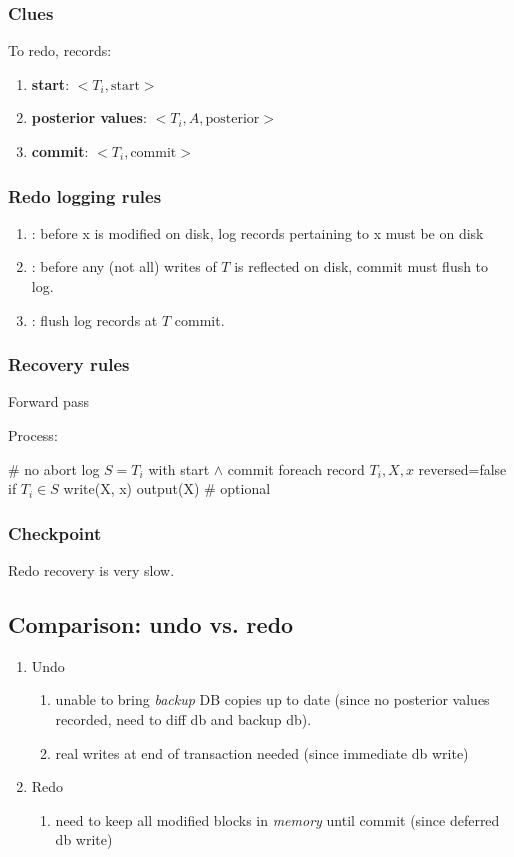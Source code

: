 \documentclass[a4paper]{report}
\begin{document}
\subsubsection{Clues}
To redo, records:
\begin{enumerate}
\item \textbf{start}: $<T_i, \text{start}>$
\item \textbf{posterior values}: $<T_i, A, \text{posterior}>$
\item \textbf{commit}: $<T_i, \text{commit}>$
\end{enumerate}

\subsubsection{Redo logging rules}
\begin{enumerate}
\item {}: before x is modified on disk, log records pertaining to x must be on disk
\item {}: before any (not all) writes of $T$ is reflected on disk, commit must flush to log.
\item {}: flush log records at $T$ commit.
\end{enumerate}

\subsubsection{Recovery rules}
Forward pass

Process:
\begin{pseudo}
# no abort log
$S = T_i$ with start $\wedge$ commit
foreach record $T_i, X, x$ reversed=false
  if $T_i \in S$
    write(X, x)
    output(X) # optional
\end{pseudo}

\subsubsection{Checkpoint}
Redo recovery is very slow.

\subsection*{Comparison: undo vs. redo }
\begin{enumerate}
\item Undo
\begin{enumerate}
\item unable to bring \textit{backup} DB copies up to date (since no posterior values recorded, need to diff db and backup db).
\item real writes at end of transaction needed (since immediate db write)
\end{enumerate}
\item Redo
\begin{enumerate}
\item need to keep all modified blocks in \textit{memory} until commit (since deferred db write)
\end{enumerate}
\end{enumerate}
\end{document}
